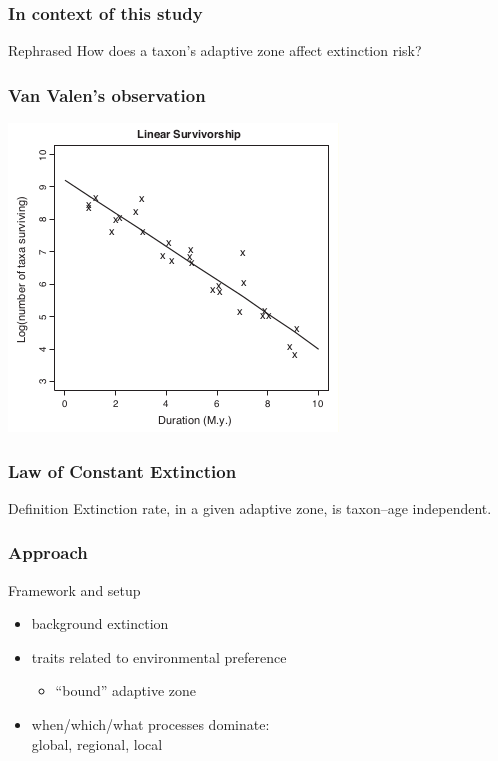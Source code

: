 \documentclass{beamer}
\begin{document}
\begin{frame}
  \frametitle{In context of this study}
  
  \begin{block}{Rephrased}
    How does a taxon's \alert{adaptive zone} affect \alert{extinction risk?}
  \end{block}
\end{frame}

\begin{frame}
  \frametitle{Van Valen's observation}

  \begin{center}
    \includegraphics[height = 0.7\textheight, keepaspectratio = true]{figure/liow}

    \tiny{}
  \end{center}
\end{frame}

\begin{frame}
  \frametitle{Law of Constant Extinction}

  \begin{alertblock}{Definition}
    Extinction rate, in a given adaptive zone, is taxon--age independent.

    \tiny{}
  \end{alertblock}
\end{frame}

\begin{frame}
  \frametitle{Approach}

  \begin{block}{Framework and setup}
    \begin{itemize}
      \item background extinction
      \item traits related to environmental preference 
        \begin{itemize}
          \item ``bound'' adaptive zone
        \end{itemize}
      \item when/which/what processes dominate: \\global, regional, local 
    \end{itemize}
  \end{block}
\end{frame}
\end{document}
